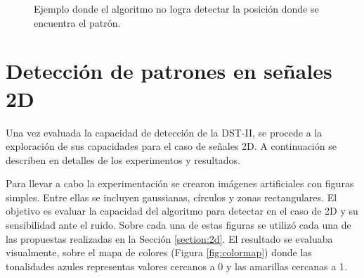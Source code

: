 \begin{figure}
	\caption{Ejemplo donde el algoritmo no logra detectar la posición donde se encuentra el patrón.} \label{fig:failed-example-experiment}
\end{figure}

\section{Detección de patrones en señales 2D}

Una vez evaluada la capacidad de detección de la DST-II, se procede a la exploración de sus capacidades 
para el caso de señales 2D. A continuación se describen en detalles de los experimentos y resultados.

Para llevar a cabo la experimentación se crearon imágenes artificiales con figuras simples. Entre ellas se incluyen gaussianas,
círculos y zonas rectangulares. El objetivo es evaluar la capacidad del algoritmo para detectar en el caso de 2D
y su sensibilidad ante el ruido. Sobre cada una de estas figuras se utilizó cada una de las propuestas realizadas 
en la Sección \ref{section:2d}.
El resultado se evaluaba visualmente, sobre el  mapa de colores (Figura \ref{fig:colormap}) donde las tonalidades azules representas
valores cercanos a 0 y las amarillas cercanas a 1.

